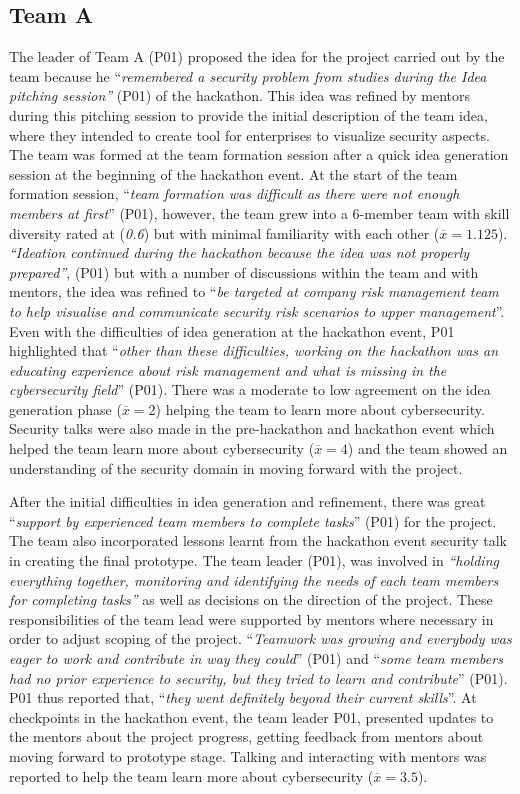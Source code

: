 \documentclass[runningheads]{llncs}
\begin{document}
\subsection{Team A}
The leader of Team A (P01) proposed the idea for the project carried out by the team because he ``\textit{remembered a security problem from studies during the Idea pitching session''} (P01) of the hackathon. This idea was refined by mentors during this pitching session to provide the initial description of the team idea, where they intended to create tool for enterprises to visualize security aspects. The team was formed at the team formation session after a quick idea generation session at the beginning of the hackathon event. At the start of the team formation session, ``\textit{team formation was difficult as there were not enough members at first}'' (P01), however, the team grew into a 6-member team with skill diversity rated at (\textit{0.6}) but with minimal familiarity with each other ($\overline{x} = 1.125$). \textit{``Ideation continued during the hackathon because the idea was not properly prepared''}, (P01) but with a number of discussions within the team and with mentors, the idea was refined to ``\textit{be targeted at company risk management team to help visualise and communicate security risk scenarios to upper management}''. Even with the difficulties of idea generation at the hackathon event, P01 highlighted that ``\textit{other than these difficulties, working on the hackathon was an educating experience about risk management and what is missing in the cybersecurity field}'' (P01). There was a moderate to low agreement on the idea generation phase ($\overline{x} = 2$) helping the team to learn more about cybersecurity. Security talks were also made in the pre-hackathon and hackathon event which helped the team learn more about cybersecurity ($\overline{x} = 4$) and the team showed an understanding of the security domain in moving forward with the project. 

After the initial difficulties in idea generation and refinement, there was great ``\textit{support by experienced team members to complete tasks}'' (P01) for the project. The team also incorporated lessons learnt from the hackathon event security talk in creating the final prototype. The team leader (P01), was involved in \textit{``holding everything together, monitoring and identifying the needs of each team members for completing tasks''} as well as decisions on the direction of the project. These responsibilities of the team lead were supported by mentors where necessary in order to adjust scoping of the project. ``\textit{Teamwork was growing and everybody was eager to work and contribute in way they could}'' (P01) and ``\textit{some team members had no prior experience to security, but they tried to learn and contribute}'' (P01). P01 thus reported that, ``\textit{they went definitely beyond their current skills}''. At checkpoints in the hackathon event, the team leader P01, presented updates to the mentors about the project progress, getting feedback from mentors about moving forward to prototype stage. Talking and interacting with mentors was reported to help the team learn more about cybersecurity ($\overline{x} = 3.5$).
\end{document}
